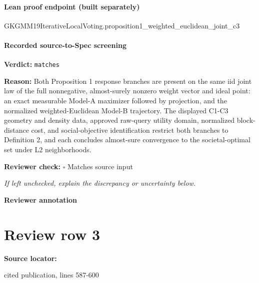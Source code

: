 \documentclass[10pt]{article}
\newcommand{\reviewerbox}{%
  \par\noindent\fbox{\parbox{0.96\linewidth}{\rule{0pt}{0.38in}}}\par
}
\newcommand{\reviewmatch}[1]{%
  \par\noindent\textbf{Reviewer check:} $\square$\; #1\par
  \noindent\emph{If left unchecked, explain the discrepancy or uncertainty below.}\par
}
\begin{document}
\paragraph{Lean proof endpoint (built separately)}\begin{ReviewVerbatim}
GKGMM19IterativeLocalVoting.proposition1_weighted_euclidean_joint_c3
\end{ReviewVerbatim}

\paragraph{Recorded source-to-Spec screening}
\textbf{Verdict:} \texttt{matches}
\\
{\raggedright
\textbf{Reason:} Both Proposition 1 response branches are present on the same iid joint law of the full nonnegative, almost-\allowbreak{}surely nonzero weight vector and ideal point:\allowbreak{} an exact measurable Model-\allowbreak{}A maximizer followed by projection, and the normalized weighted-\allowbreak{}Euclidean Model-\allowbreak{}B trajectory.\allowbreak{} The displayed C1-\allowbreak{}C3 geometry and density data, approved raw-\allowbreak{}query utility domain, normalized block-\allowbreak{}distance cost, and social-\allowbreak{}objective identification restrict both branches to Definition 2, and each concludes almost-\allowbreak{}sure convergence to the societal-\allowbreak{}optimal set under L2 neighborhoods.\allowbreak{}
\par}
\reviewmatch{Matches source input}
\noindent\textbf{Reviewer annotation}\par
\reviewerbox
\clearpage
\hypertarget{source-claim-d36270613434ba50}{}
\section*{Review row 3}
\textbf{Source locator:} {\footnotesize\raggedright cited publication, lines 587-\allowbreak{}600\par}
\end{document}
